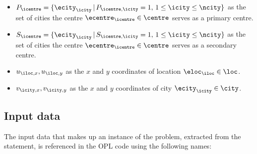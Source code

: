 \begin{itemize}
    
    \item $P_\icentre = \{ \ecity_\icity \,|\, P_{\icentre, \icity} = 1, \, 1 \le \icity \le \ncity \}$
    as the set of cities the centre $\ecentre_\icentre \in \centre$ serves as a primary centre.
    
    \item $S_\icentre = \{ \ecity_\icity \,|\, S_{\icentre, \icity} = 1, \, 1 \le \icity \le \ncity \}$
    as the set of cities the centre $\ecentre_\icentre \in \centre$ serves as a secondary centre.
    
    \item $u_{\iloc, x}, u_{\iloc, y}$ as the $x$ and $y$ coordinates of location $\eloc_\iloc \in \loc$.

    \item $v_{\icity, x}, v_{\icity, y}$ as the $x$ and $y$ coordinates of city $\ecity_\icity \in \city$.
    
\end{itemize}

\subsection{Input data}

The input data that makes up an instance of the problem, extracted from the statement, is referenced in
the OPL code using the following names:

